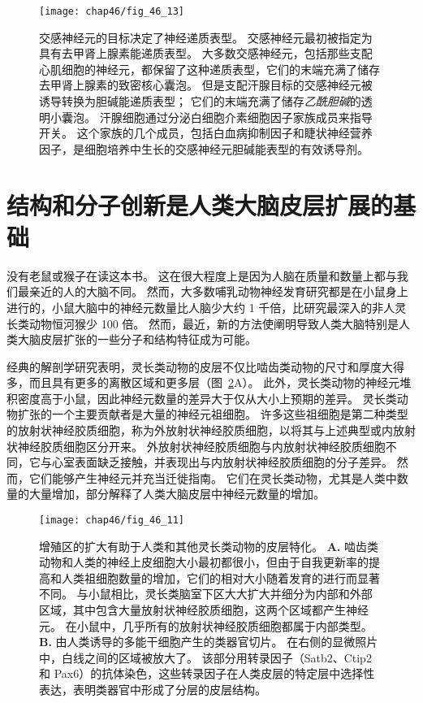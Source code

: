 \begin{figure}[htbp]
	\centering
	\texttt{[image: chap46/fig\_46\_13]}
	\caption{交感神经元的目标决定了神经递质表型。
		交感神经元最初被指定为具有去甲肾上腺素能递质表型。
		大多数交感神经元，包括那些支配心肌细胞的神经元，都保留了这种递质表型，它们的末端充满了储存去甲肾上腺素的致密核心囊泡。
		但是支配汗腺目标的交感神经元被诱导转换为胆碱能递质表型；
		它们的末端充满了储存\textit{乙酰胆碱}的透明小囊泡。
		汗腺细胞通过分泌白细胞介素细胞因子家族成员来指导开关。
		这个家族的几个成员，包括白血病抑制因子和睫状神经营养因子，是细胞培养中生长的交感神经元胆碱能表型的有效诱导剂。}
	\label{fig:46_13}
\end{figure}



\section{结构和分子创新是人类大脑皮层扩展的基础}

没有老鼠或猴子在读这本书。
这在很大程度上是因为人脑在质量和数量上都与我们最亲近的人的大脑不同。
然而，大多数哺乳动物神经发育研究都是在小鼠身上进行的，小鼠大脑中的神经元数量比人脑少大约 1 千倍，比研究最深入的非人灵长类动物恒河猴少 100 倍。
然而，最近，新的方法使阐明导致人类大脑特别是人类大脑皮层扩张的一些分子和结构特征成为可能。


经典的解剖学研究表明，灵长类动物的皮层不仅比啮齿类动物的尺寸和厚度大得多，而且具有更多的离散区域和更多层（图~\ref{fig:46_11}A）。
此外，灵长类动物的神经元堆积密度高于小鼠，因此神经元数量的差异大于仅从大小上预期的差异。
灵长类动物扩张的一个主要贡献者是大量的神经元祖细胞。
许多这些祖细胞是第二种类型的放射状神经胶质细胞，称为外放射状神经胶质细胞，以将其与上述典型或内放射状神经胶质细胞区分开来。
外放射状神经胶质细胞与内放射状神经胶质细胞不同，它与心室表面缺乏接触，并表现出与内放射状神经胶质细胞的分子差异。
然而，它们能够产生神经元并充当迁徙指南。
它们在灵长类动物，尤其是人类中数量的大量增加，部分解释了人类大脑皮层中神经元数量的增加。


\begin{figure}[htbp]
	\centering
	\texttt{[image: chap46/fig\_46\_11]}
	\caption{增殖区的扩大有助于人类和其他灵长类动物的皮层特化。
		\textbf{A.} 啮齿类动物和人类的神经上皮细胞大小最初都很小，但由于自我更新率的提高和人类祖细胞数量的增加，它们的相对大小随着发育的进行而显著不同。
		与小鼠相比，灵长类脑室下区大大扩大并细分为内部和外部区域，其中包含大量放射状神经胶质细胞，这两个区域都产生神经元。
		在小鼠中，几乎所有的放射状神经胶质细胞都属于内部类型\cite{giandomenico2017probing}。
		\textbf{B.} 由人类诱导的多能干细胞产生的类器官切片。
		在右侧的显微照片中，白线之间的区域被放大了。
		该部分用转录因子（Satb2、Ctip2 和 Pax6）的抗体染色，这些转录因子在人类皮层的特定层中选择性表达，表明类器官中形成了分层的皮层结构。}
	\label{fig:46_11}
\end{figure}



